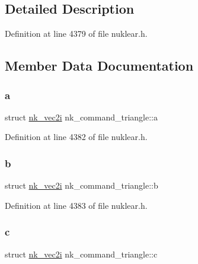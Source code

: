 \subsection{Detailed Description}


Definition at line 4379 of file nuklear.\+h.



\subsection{Member Data Documentation}
\mbox{\label{structnk__command__triangle_a3075515b028883cd55113bd830cc3b19}} 
\subsubsection{\texorpdfstring{a}{a}}
{\footnotesize\ttfamily struct \mbox{\hyperlink{structnk__vec2i}{nk\+\_\+vec2i}} nk\+\_\+command\+\_\+triangle\+::a}



Definition at line 4382 of file nuklear.\+h.

\mbox{\label{structnk__command__triangle_a50fdee47bcbf228ac6948f7f501a7f31}} 
\subsubsection{\texorpdfstring{b}{b}}
{\footnotesize\ttfamily struct \mbox{\hyperlink{structnk__vec2i}{nk\+\_\+vec2i}} nk\+\_\+command\+\_\+triangle\+::b}



Definition at line 4383 of file nuklear.\+h.

\mbox{\label{structnk__command__triangle_a66cc7af34255c6b6e6949ee7ce1f6539}} 
\subsubsection{\texorpdfstring{c}{c}}
{\footnotesize\ttfamily struct \mbox{\hyperlink{structnk__vec2i}{nk\+\_\+vec2i}} nk\+\_\+command\+\_\+triangle\+::c}



